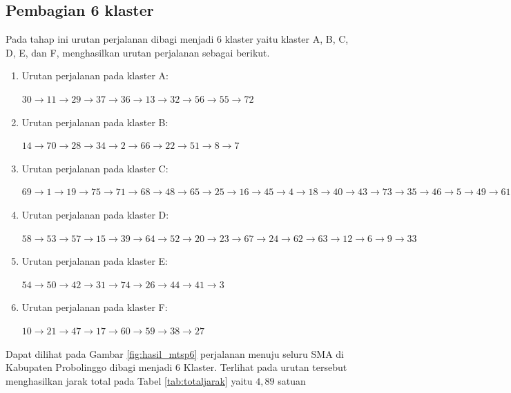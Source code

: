 \subsection{Pembagian 6 klaster}

Pada tahap ini urutan perjalanan dibagi menjadi 6 klaster yaitu klaster A, B, C, D, E, dan F, menghasilkan urutan perjalanan sebagai berikut.

\begin{enumerate}

\item Urutan perjalanan pada klaster A:

$30\rightarrow11\rightarrow29\rightarrow37\rightarrow36\rightarrow13\rightarrow32\rightarrow56\rightarrow55\rightarrow72$

\item Urutan perjalanan pada klaster B:

$14\rightarrow70\rightarrow28\rightarrow34\rightarrow2\rightarrow66\rightarrow22\rightarrow51\rightarrow8\rightarrow7$

\item Urutan perjalanan pada klaster C:

$69\rightarrow1\rightarrow19\rightarrow75\rightarrow71\rightarrow68\rightarrow48\rightarrow65\rightarrow25\rightarrow16\rightarrow45\rightarrow4\rightarrow18\rightarrow40\rightarrow43\rightarrow73\rightarrow35\rightarrow46\rightarrow5\rightarrow49\rightarrow61$

\item Urutan perjalanan pada klaster D:

$58\rightarrow53\rightarrow57\rightarrow15\rightarrow39\rightarrow64\rightarrow52\rightarrow20\rightarrow23\rightarrow67\rightarrow24\rightarrow62\rightarrow63\rightarrow12\rightarrow6\rightarrow9\rightarrow33$

\item Urutan perjalanan pada klaster E:

$54\rightarrow50\rightarrow42\rightarrow31\rightarrow74\rightarrow26\rightarrow44\rightarrow41\rightarrow3$

\item Urutan perjalanan pada klaster F:

$10\rightarrow21\rightarrow47\rightarrow17\rightarrow60\rightarrow59\rightarrow38\rightarrow27$

\end{enumerate}

Dapat dilihat pada Gambar \ref{fig:hasil_mtsp6} perjalanan menuju seluru SMA di Kabupaten Probolinggo dibagi menjadi 6 Klaster. Terlihat pada urutan tersebut menghasilkan jarak total pada Tabel \ref{tab:totaljarak} yaitu $4,89$ satuan

